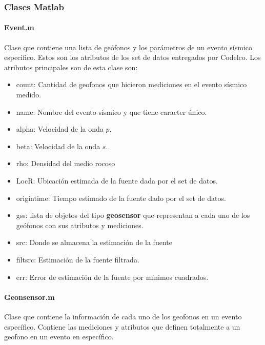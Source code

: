 \subsubsection{Clases Matlab}
\paragraph{Event.m}
Clase que contiene una lista de geófonos y los parámetros de un evento
sísmico especifico. Estos son los atributos de los set de datos entregados
por Codelco. Los atributos principales son de esta clase son:
\begin{itemize}
  \item count: Cantidad de geofonos que hicieron mediciones en el evento sísmico
  medido.
  \item name: Nombre del evento sísmico y que tiene caracter único.
  \item alpha: Velocidad de la onda $p$.
  \item beta: Velocidad de la onda $s$.
  \item rho: Densidad del medio rocoso
  \item LocR: Ubicación estimada de la fuente dada por el set de datos.
  \item origintime: Tiempo estimado de la fuente dado por el set de datos.
  \item gss: lista de objetos del tipo \textbf{geosensor} que representan a cada
  uno de los geófonos con sus atributos y mediciones.
  \item src: Donde se almacena la estimación de la fuente
  \item filtsrc: Estimación de la fuente filtrada.
  \item err: Error de estimación de la fuente por mínimos cuadrados.
\end{itemize}

\paragraph{Geonsensor.m}
Clase que contiene la información de cada uno de los geofonos en un evento
específico. Contiene las mediciones y atributos que definen totalmente a un
geofono en un evento en específico.

